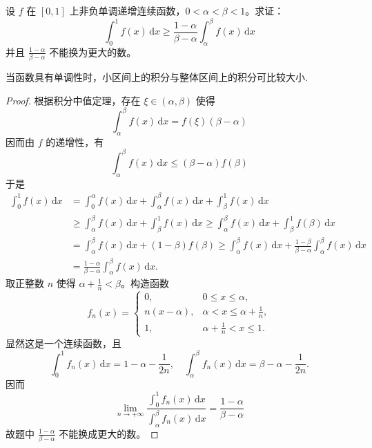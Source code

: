 \documentclass[../../main.tex]{subfiles}%
\begin{document}
\begin{example}
设 \( f \) 在 \([0,1]\) 上非负单调递增连续函数，\( 0 < \alpha < \beta < 1 \)。求证：
\[
\int_{0}^{1} f(x) \, \mathrm{d}x \geqslant \frac{1 - \alpha}{\beta - \alpha} \int_{\alpha}^{\beta} f(x) \, \mathrm{d}x
\]
并且 \( \frac{1 - \alpha}{\beta - \alpha} \) 不能换为更大的数。
\end{example}
\begin{remark}
当函数具有单调性时，小区间上的积分与整体区间上的积分可比较大小.
\end{remark}
\begin{proof}

根据积分中值定理，存在 \( \xi \in (\alpha, \beta) \) 使得
\[
\int_{\alpha}^{\beta} f(x) \, \mathrm{d}x = f(\xi)(\beta - \alpha)
\]
因而由 \( f \) 的递增性，有
\[
\int_{\alpha}^{\beta} f(x) \, \mathrm{d}x \leqslant (\beta - \alpha)f(\beta)
\]
于是
\begin{align*}
\int_{0}^{1} f(x) \, \mathrm{d}x &= \int_{0}^{\alpha} f(x) \, \mathrm{d}x + \int_{\alpha}^{\beta} f(x) \, \mathrm{d}x + \int_{\beta}^{1} f(x) \, \mathrm{d}x \\
&\geqslant \int_{\alpha}^{\beta} f(x) \, \mathrm{d}x + \int_{\beta}^{1} f(x) \, \mathrm{d}x \geqslant \int_{\alpha}^{\beta} f(x) \, \mathrm{d}x + \int_{\beta}^{1} f(\beta) \, \mathrm{d}x \\
&= \int_{\alpha}^{\beta} f(x) \, \mathrm{d}x + (1 - \beta)f(\beta) \geqslant \int_{\alpha}^{\beta} f(x) \, \mathrm{d}x + \frac{1 - \beta}{\beta - \alpha} \int_{\alpha}^{\beta} f(x) \, \mathrm{d}x \\
&= \frac{1 - \alpha}{\beta - \alpha} \int_{\alpha}^{\beta} f(x) \, \mathrm{d}x.
\end{align*}
取正整数 \( n \) 使得 \( \alpha + \frac{1}{n} < \beta \)。构造函数
\[
f_n(x) = \begin{cases} 
0, & 0 \leqslant x \leqslant \alpha, \\
n(x - \alpha), & \alpha < x \leqslant \alpha + \frac{1}{n}, \\
1, & \alpha + \frac{1}{n} < x \leqslant 1 .
\end{cases}
\]
显然这是一个连续函数，且
\[
\int_{0}^{1} f_n(x) \, \mathrm{d}x = 1 - \alpha - \frac{1}{2n}, \quad \int_{\alpha}^{\beta} f_n(x) \, \mathrm{d}x = \beta - \alpha - \frac{1}{2n}.
\]
因而
\[
\lim_{n \to +\infty} \frac{\int_{0}^{1} f_n(x) \, \mathrm{d}x}{\int_{\alpha}^{\beta} f_n(x) \, \mathrm{d}x} = \frac{1 - \alpha}{\beta - \alpha}
\]
故题中 \( \frac{1 - \alpha}{\beta - \alpha} \) 不能换成更大的数。

\end{proof}
\end{document}

